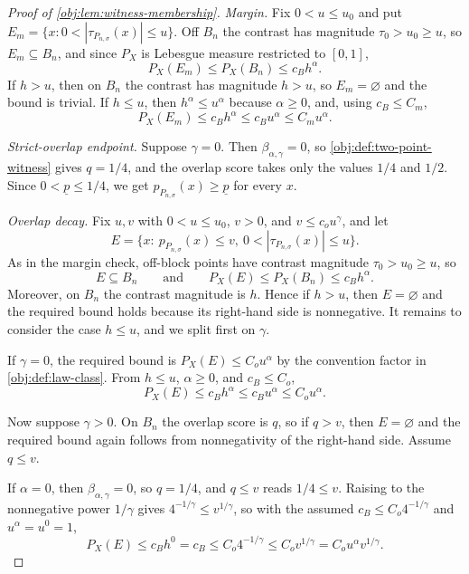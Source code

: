 \begin{proof}[Proof of \cref{obj:lem:witness-membership}]
\emph{Margin.}  Fix \(0<u\le u_0\) and put \(E_m=\{x:0<|\tau_{P_{n,\sigma}}(x)|\le u\}\).  Off \(B_n\) the contrast has magnitude \(\tau_0>u_0\ge u\), so \(E_m\subseteq B_n\), and since \(P_X\) is Lebesgue measure restricted to \([0,1]\),
\[
P_X(E_m)\le P_X(B_n)\le c_Bh^\alpha .
\]
If \(h>u\), then on \(B_n\) the contrast has magnitude \(h>u\), so \(E_m=\varnothing\) and the bound is trivial.  If \(h\le u\), then \(h^\alpha\le u^\alpha\) because \(\alpha\ge0\), and, using \(c_B\le C_m\),
\[
P_X(E_m)\le c_Bh^\alpha\le c_Bu^\alpha\le C_mu^\alpha .
\]

\emph{Strict-overlap endpoint.}  Suppose \(\gamma=0\).  Then \(\beta_{\alpha,\gamma}=0\), so \cref{obj:def:two-point-witness} gives \(q=1/4\), and the overlap score takes only the values \(1/4\) and \(1/2\).  Since \(0<\underline p\le1/4\), we get \(p_{P_{n,\sigma}}(x)\ge\underline p\) for every \(x\). %

\emph{Overlap decay.}  Fix \(u,v\) with \(0<u\le u_0\), \(v>0\), and \(v\le c_ou^\gamma\), and let
\[
E=\{x:\ p_{P_{n,\sigma}}(x)\le v,\ 0<|\tau_{P_{n,\sigma}}(x)|\le u\}.
\]
As in the margin check, off-block points have contrast magnitude \(\tau_0>u_0\ge u\), so
\[
E\subseteq B_n
\qquad\text{and}\qquad
P_X(E)\le P_X(B_n)\le c_Bh^\alpha .
\]
Moreover, on \(B_n\) the contrast magnitude is \(h\).  Hence if \(h>u\), then \(E=\varnothing\) and the required bound holds because its right-hand side is nonnegative.  It remains to consider the case \(h\le u\), and we split first on \(\gamma\).

If \(\gamma=0\), the required bound is \(P_X(E)\le C_ou^\alpha\) by the convention factor in \cref{obj:def:law-class}.  From \(h\le u\), \(\alpha\ge0\), and \(c_B\le C_o\),
\[
P_X(E)\le c_Bh^\alpha\le c_Bu^\alpha\le C_ou^\alpha .
\]

Now suppose \(\gamma>0\).  On \(B_n\) the overlap score is \(q\), so if \(q>v\), then \(E=\varnothing\) and the required bound again follows from nonnegativity of the right-hand side.  Assume \(q\le v\).

If \(\alpha=0\), then \(\beta_{\alpha,\gamma}=0\), so \(q=1/4\), and \(q\le v\) reads \(1/4\le v\).  Raising to the nonnegative power \(1/\gamma\) gives \(4^{-1/\gamma}\le v^{1/\gamma}\), so with the assumed \(c_B\le C_o4^{-1/\gamma}\) and \(u^\alpha=u^0=1\),
\[
P_X(E)\le c_Bh^0=c_B\le C_o4^{-1/\gamma}\le C_o v^{1/\gamma}=C_ou^\alpha v^{1/\gamma}.
\]


\end{proof}

